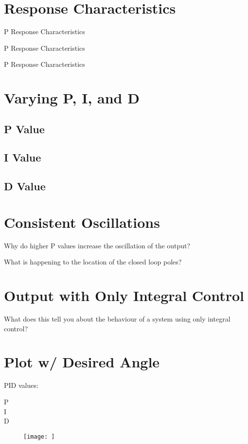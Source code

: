 \section{Response Characteristics}

\begin{table}[H]
	\centering
	\caption{P Response Characteristics}
	\label{tab:p-data}
\end{table} 

\begin{table}[H]
	\centering
	\caption{P Response Characteristics}
	\label{tab:p-data}
\end{table} 

\begin{table}[H]
	\centering
	\caption{P Response Characteristics}
	\label{tab:p-data}
\end{table}
\section{Varying P, I, and D}

\subsection{P Value}
\subsection{I Value}
\subsection{D Value}

\section{Consistent Oscillations}

Why do higher P values increase the oscillation of the output?

What is happening to the location of the closed loop poles?

\section{Output with Only Integral Control}

What does this tell you about the behaviour of a system using only integral control?

\section{Plot w/ Desired Angle}
PID values: 
\begin{description}
	\item[P] 
	\item[I]	
	\item[D]
\end{description}

\begin{figure}[H]
	\centering
	\texttt{[image: ]}
	\caption{}
	\label{fig:}
\end{figure}
